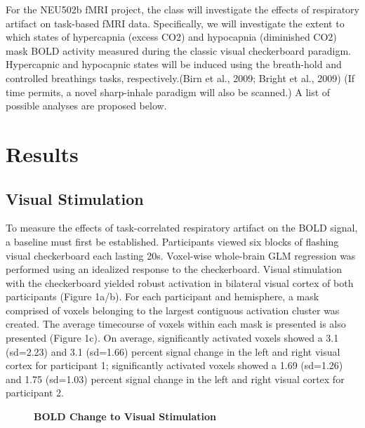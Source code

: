 \documentclass[9pt]{NEU502b-fmri}
\begin{document}
For the NEU502b fMRI project, the class will investigate the effects of respiratory artifact on task-based fMRI data. Specifically, we will investigate the extent to which states of hypercapnia (excess CO2) and hypocapnia (diminished CO2) mask BOLD activity measured during the classic visual checkerboard paradigm. Hypercapnic and hypocapnic states will be induced using the breath-hold and controlled breathings tasks, respectively.(Birn et al., 2009; Bright et al., 2009) (If time permits, a novel sharp-inhale paradigm will also be scanned.) A list of possible analyses are proposed below. 

\section{Results}

\subsection{Visual Stimulation}
To measure the effects of task-correlated respiratory artifact on the BOLD signal, a baseline must first be established. Participants viewed six blocks of flashing visual checkerboard each lasting 20s. Voxel-wise whole-brain GLM regression was performed using an idealized response to the checkerboard. Visual stimulation with the checkerboard yielded robust activation in bilateral visual cortex of both participants (Figure 1a/b).  For each participant and hemisphere, a mask comprised of voxels belonging to the largest contiguous activation cluster was created. The average timecourse of voxels within each mask is presented is also presented (Figure 1c). On average, significantly activated voxels showed a 3.1 (sd=2.23) and 3.1 (sd=1.66) percent signal change in the left and right visual cortex for participant 1;  significantly activated voxels showed a 1.69 (sd=1.26) and 1.75 (sd=1.03) percent signal change in the left and right visual cortex for participant 2. 

\begin{figure}
\centerline{%
%
}
\caption{\textbf{BOLD Change to Visual Stimulation}}

\end{figure}
\end{document}
